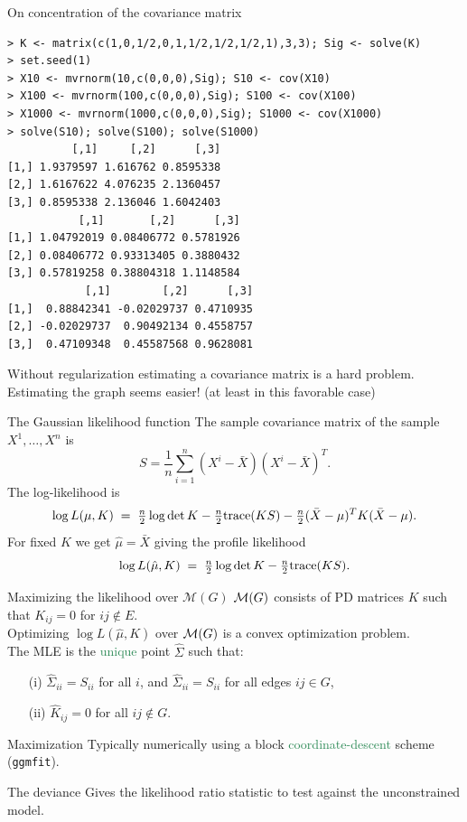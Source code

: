 \documentclass[11pt,handout,aspectratio=169,dvipsnames]{beamer}
\begin{document}
\begin{frame}[fragile,label=samplcov]{On concentration of the covariance matrix}
	\begin{lstlisting}
> K <- matrix(c(1,0,1/2,0,1,1/2,1/2,1/2,1),3,3); Sig <- solve(K)
> set.seed(1)
> X10 <- mvrnorm(10,c(0,0,0),Sig); S10 <- cov(X10)
> X100 <- mvrnorm(100,c(0,0,0),Sig); S100 <- cov(X100)
> X1000 <- mvrnorm(1000,c(0,0,0),Sig); S1000 <- cov(X1000)
> solve(S10); solve(S100); solve(S1000)
          [,1]     [,2]      [,3]
[1,] 1.9379597 1.616762 0.8595338
[2,] 1.6167622 4.076235 2.1360457
[3,] 0.8595338 2.136046 1.6042403
           [,1]       [,2]      [,3]
[1,] 1.04792019 0.08406772 0.5781926
[2,] 0.08406772 0.93313405 0.3880432
[3,] 0.57819258 0.38804318 1.1148584
            [,1]        [,2]      [,3]
[1,]  0.88842341 -0.02029737 0.4710935
[2,] -0.02029737  0.90492134 0.4558757
[3,]  0.47109348  0.45587568 0.9628081\end{lstlisting}
Without regularization estimating a covariance matrix is a hard problem.\\[.2cm]
Estimating the graph seems easier! (at least in this favorable case)
\end{frame}

\begin{frame}{The Gaussian likelihood function}
	The sample covariance matrix of the sample $X^{1},\ldots,X^n$ is
	$$S=\frac{1}{n}\sum_{i=1}^n(X^i-\bar X)(X^i-\bar X)^T.$$
The log-likelihood is
$$\log L(\mu,K)\;=\;\tfrac{n}{2}\log\det K-\tfrac{n}{2}\text{trace}(KS)-\tfrac{n}{2}(\bar X-\mu)^T K(\bar X-\mu).$$
For fixed $K$ we get $\hat\mu=\bar X$ giving the \alert{profile likelihood}
$$
\log L(\hat \mu,K)\;=\;\tfrac{n}{2}\log\det K-\tfrac{n}{2}\text{trace}(KS).
$$
\end{frame}

\begin{frame}{Maximizing the likelihood over $\mathcal M(G)$}
${\cal M}(G)$ consists of PD matrices $K$ such that $K_{ij}=0$ for $ij\notin E$. \\[.3cm]

	Optimizing $\log L(\hat \mu,K)$ over ${\cal M}(G)$ is a convex optimization problem.\\[.3cm]
	The MLE is the \textcolor{SeaGreen}{unique} point $\hat\Sigma$ such that:
	\begin{enumerate}
		\item [(i)] $\hat\Sigma_{ii}=S_{ii}$ for all $i$, and $\hat\Sigma_{ii}=S_{ii}$ for all edges $ij\in G$,
		\item [(ii)] $\hat K_{ij}=0$ for all $ij\notin G$.
	\end{enumerate}
	\begin{alertblock}{Maximization}
		Typically numerically using a block \textcolor{SeaGreen}{coordinate-descent} scheme (\texttt{ggmfit}).
	\end{alertblock}
		\begin{alertblock}{The deviance}
		Gives the likelihood ratio statistic to test against the unconstrained model. 
	\end{alertblock}
\end{frame}
\end{document}
